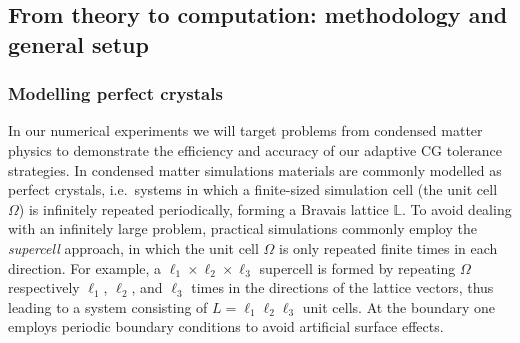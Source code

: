\documentclass[hidelinks,onefignum,onetabnum]{siamart250211}
\newcommand{\La}{\mathbb{L}}
\begin{document}
\subsection{From theory to computation: methodology and general setup}
\subsubsection{Modelling perfect crystals}
\label{sec:crystals}
In our numerical experiments we will target problems
from condensed matter physics to demonstrate the efficiency and accuracy
of our adaptive CG tolerance strategies.
In condensed matter simulations
materials are commonly modelled as perfect crystals,
i.e.~systems in which a finite-sized simulation cell (the unit cell $\Omega$)
is infinitely repeated periodically, forming a Bravais lattice $\La$.
To avoid dealing with an infinitely large problem,
practical simulations commonly employ the \textit{supercell} approach,
in which the unit cell $\Omega$ is only repeated finite times in each direction.
For example, a $\ell_1 \times \ell_2 \times \ell_3$ supercell is formed
by repeating $\Omega$ respectively $\ell_1$, $\ell_2$, and $\ell_3$
times in the directions of the lattice vectors,
thus leading to a system consisting of  $L = \ell_1 \ell_2 \ell_3$ unit cells.
At the boundary one employs periodic boundary conditions %
to avoid artificial surface effects.
\end{document}
